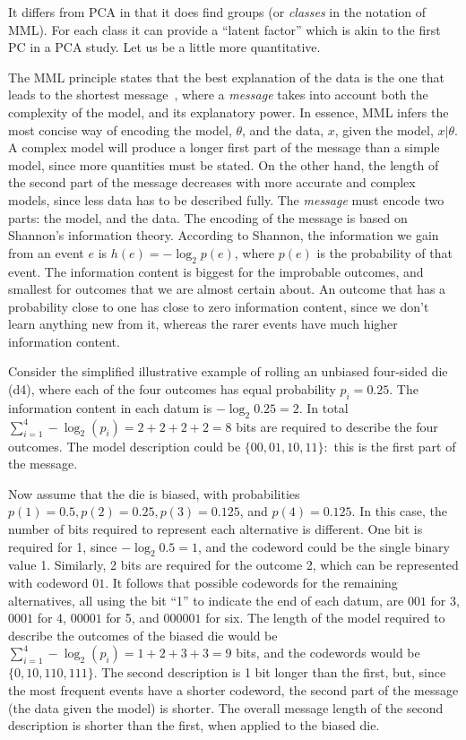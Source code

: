 \documentclass{elsarticle}
\begin{document}
It differs from PCA in that it does find groups (or {\it classes\/} in the notation of MML). For each class  it can provide a ``latent factor'' which is akin to the first PC in a PCA study. Let us be a little more quantitative.

The MML principle states that the best explanation of the data is the one that leads to the shortest message~\cite{Wallace05}, 
where a \textit{message} takes into account both the complexity of the model, and its explanatory power. 
In essence, MML infers the most concise way of encoding the model, $\theta$, and the data, $x$, given the model, $x|\theta$. 
A complex model will produce a longer first part of the message than a simple model, 
since more quantities must be stated. On the other hand, the length of the second part of the 
message decreases with more accurate and complex models, since less data has to be described fully.
The \textit{message} must encode two parts: the model, and the data. 
The encoding of the message is based on Shannon's information theory. According to Shannon, the information we gain from an event $e$ is $h(e) = - \log_2 p(e)$, where $p(e)$ is the probability of that event. The information content is biggest for the improbable outcomes, and smallest for outcomes that we are almost certain about. An outcome that has a probability close to one has close to zero information content, since we don't learn anything new from it, whereas the rarer events have much higher information content. 

Consider the simplified illustrative example of rolling an unbiased four-sided die (d4), 
where each of the four outcomes %
has equal probability $p_i=0.25$. The information content in each datum is $- \log_2 0.25 = 2$. 
In total $\sum_{i=1}^4-\log_2 (p_i) = 2 + 2 + 2 + 2 = 8$ bits are required to describe the four outcomes. 
The model description could be $\{00,01,10,11\}$:~this is the first part of the message. %

Now assume that the die is biased, with probabilities
$p(1)=0.5, p(2)=0.25, p(3)=0.125$, and $p(4)=0.125$. 
In this case, the number of bits required to represent each alternative is different. One bit is required for 1, since $-\log_2 0.5 = 1$, and the codeword could be the single binary value 1. Similarly, 2 bits are required for the outcome 2, which can be represented with codeword $01$. It follows that possible codewords for the remaining alternatives, all using the bit ``1'' to indicate the end of each datum, are $001$ for 3, $0001$ for 4, $00001$ for 5, and $000001$ for six. 
The length of the model required to describe 
the outcomes of the biased die would be 
$\sum_{i=1}^4-\log_2 (p_i) = 1 + 2 + 3 + 3 = 9$ bits, and the codewords 
would be $\{0,10,110,111\}$.
The second description is 1 bit longer than the first, 
but, since the most frequent events have a shorter codeword,
the second part of the message (the data given the model) is shorter. The overall message length of the second description is shorter than the first, when applied to the biased die. 
\end{document}
